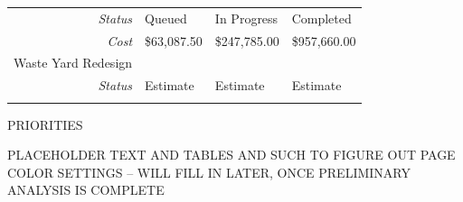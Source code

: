 \begin{table}[H]
\begin{tabular}{r|l|l|l|}
\multicolumn{1}{|r|}{\cellcolor{ccorangelight}\textit{Status}}                & Queued                                                           & In Progress                                                             & Completed                                                    \\
\multicolumn{1}{|r|}{\cellcolor{ccorangelight}\textit{Cost}}                  & \$63,087.50                                                      & \$247,785.00                                                            & \$957,660.00                                                 \\ \hline
\multicolumn{1}{|V{.2\columnwidth}|}{\cellcolor{ccorangelight}Waste Yard Redesign}            &                                                                  &                                                                         &                                                              \\
\multicolumn{1}{|r|}{\cellcolor{ccorangelight}\textit{Status}}                & Estimate                                                         & Estimate                                                                & Estimate                                                     \\
\multicolumn{1}{|r|}{\cellcolor{ccorangelight}}                               &                                                                  &                                                                         &                                                              \\ \hline
\end{tabular}
\end{table}
\pagebreak

\textcolor{ccorange}{PRIORITIES}

PLACEHOLDER TEXT AND TABLES AND SUCH TO FIGURE OUT PAGE COLOR SETTINGS -- WILL FILL IN LATER, ONCE PRELIMINARY ANALYSIS IS COMPLETE
\pagebreak
\pagestyle{plain}
\pagecolor{ccfuschia}
\pagebreak
{}
\pagestyle{fancy}
\fancyhf{}
\renewcommand{\chaptermark}[1]{\markboth{#1}{}}
\fancyfoot[LE,RO]{\thepage}


